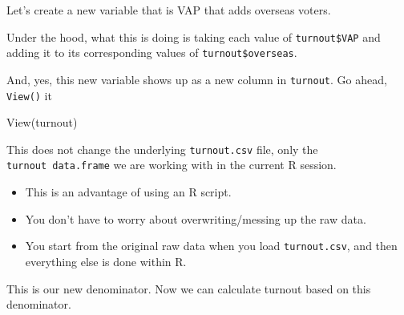 \documentclass[
  letterpaper,
  DIV=11,
  numbers=noendperiod]{scrreprt}
\newenvironment{Shaded}{\begin{snugshade}}{\end{snugshade}}
\newcommand{\CommentTok}[1]{\textcolor[rgb]{0.37,0.37,0.37}{#1}}
\newcommand{\FunctionTok}[1]{\textcolor[rgb]{0.28,0.35,0.67}{#1}}
\newcommand{\NormalTok}[1]{\textcolor[rgb]{0.00,0.23,0.31}{#1}}
\newcommand{\OtherTok}[1]{\textcolor[rgb]{0.00,0.23,0.31}{#1}}
\newcommand{\SpecialCharTok}[1]{\textcolor[rgb]{0.37,0.37,0.37}{#1}}
\providecommand{\tightlist}{%
  \setlength{\itemsep}{0pt}\setlength{\parskip}{0pt}}\usepackage{longtable,booktabs,array}
\begin{document}
Let's create a new variable that is VAP that adds overseas voters.

\begin{Shaded}
\end{Shaded}

Under the hood, what this is doing is taking each value of
\texttt{turnout\$VAP} and adding it to its corresponding values of
\texttt{turnout\$overseas}.

And, yes, this new variable shows up as a new column in
\texttt{turnout}. Go ahead, \texttt{View()} it

\begin{Shaded}
\begin{Highlighting}[]
\FunctionTok{View}\NormalTok{(turnout)}
\end{Highlighting}
\end{Shaded}

This does not change the underlying \texttt{turnout.csv} file, only the
\texttt{turnout\ data.frame} we are working with in the current R
session.

\begin{itemize}
\tightlist
\item
  This is an advantage of using an R script.
\item
  You don't have to worry about overwriting/messing up the raw data.
\item
  You start from the original raw data when you load
  \texttt{turnout.csv}, and then everything else is done within R.
\end{itemize}

This is our new denominator. Now we can calculate turnout based on this
denominator.

\begin{Shaded}
\end{Shaded}
\end{document}
